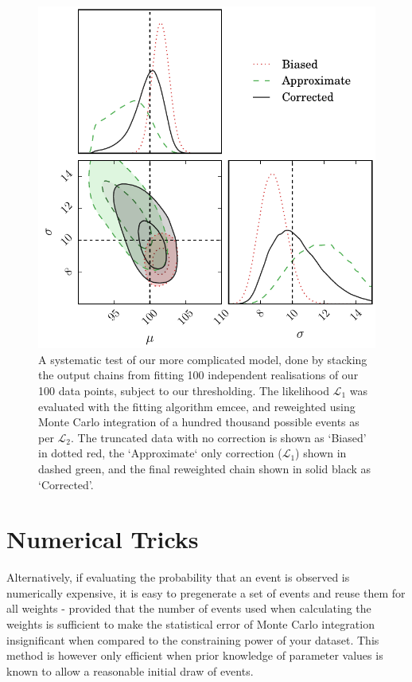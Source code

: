 \documentclass[a4paper,fleqn,usenatbib]{mnras}
\begin{document}
\begin{figure}
	\begin{center}
		\includegraphics[width=\columnwidth]{example/real.pdf}
	\end{center}
	\caption{A systematic test of our more complicated model, done by stacking the output chains from fitting 100 independent realisations of our 100 data points, subject to our thresholding. The likelihood $\mathcal{L}_1$ was evaluated with the fitting algorithm emcee, and reweighted using Monte Carlo integration of a hundred thousand possible events as per $\mathcal{L}_2$. The truncated data with no correction is shown as `Biased' in dotted red, the `Approximate` only correction ($\mathcal{L}_1$) shown in dashed green, and the final reweighted chain shown in solid black as `Corrected'.}
	\label{fig:real}
\end{figure}

\section{Numerical Tricks}
\label{sec:tricks}
Alternatively, if evaluating the probability that an event is observed is numerically expensive, it is easy to pregenerate a set of events and reuse them for all weights - provided that the number of events used when calculating the weights is sufficient to make the statistical error of Monte Carlo integration insignificant when compared to the constraining power of your dataset. This method is however only efficient when prior knowledge of parameter values is known to allow a reasonable initial draw of events.
\end{document}
